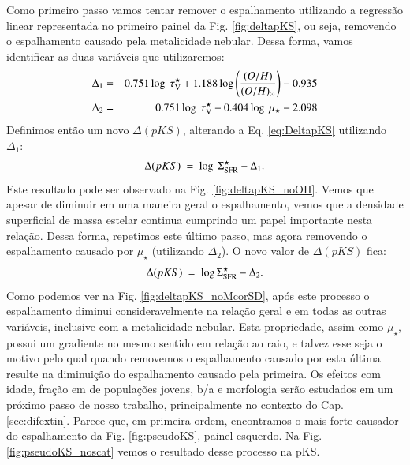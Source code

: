 Como primeiro passo vamos tentar remover o espalhamento utilizando a regressão linear representada
no primeiro painel da Fig. \ref{fig:deltapKS}, ou seja, removendo o espalhamento causado pela
metalicidade nebular. Dessa forma, vamos identificar as duas variáveis que utilizaremos:
\begin{eqnarray}
	\Delta_1 &=& 0.751 \log\ \tau_{\mathrm{V}}^\star + 1.188 \log \left(\frac{(O/H)}{(O/H)_\odot}\right) - 0.935 \\
	\label{eq:Delta1}
	\Delta_2 &=& 0.751 \log\ \tau_{\mathrm{V}}^\star + 0.404 \log\ \mu_\star - 2.098 \\
	\label{eq:Delta2}
\end{eqnarray}
Definimos então um novo $\Delta(pKS)$, alterando a Eq. \ref{eq:DeltapKS} utilizando $\Delta_1$:
\begin{equation}
	\Delta(pKS)\ =\ \log\ \Sigma_{\mathrm{SFR}}^\star - \Delta_1.
\end{equation}
\noindent Este resultado pode ser observado na Fig. \ref{fig:deltapKS_noOH}. Vemos que apesar
de diminuir em uma maneira geral o espalhamento, vemos que a densidade superficial de massa estelar
continua cumprindo um papel importante nesta relação. Dessa forma, repetimos este último passo, mas
agora removendo o espalhamento causado por $\mu_\star$ (utilizando $\Delta_2$). O novo valor de
$\Delta(pKS)$ fica:
\begin{equation}
	\Delta(pKS)\ =\ \log \Sigma_{\mathrm{SFR}}^\star - \Delta_2.
\end{equation}
\noindent Como podemos ver na Fig. \ref{fig:deltapKS_noMcorSD}, após este processo o
espalhamento diminui consideravelmente na relação geral e em todas as outras variáveis, inclusive
com a metalicidade nebular. Esta propriedade, assim como $\mu_\star$, possui um gradiente no mesmo
sentido em relação ao raio, e talvez esse seja o motivo pelo qual quando removemos o espalhamento
causado por esta última resulte na diminuição do espalhamento causado pela primeira. Os efeitos com
idade, fração em de populações jovens, b/a e morfologia serão estudados em um próximo passo de
nosso trabalho, principalmente no contexto do Cap. \ref{sec:difextin}. Parece que, em primeira
ordem, encontramos o mais forte causador do espalhamento da Fig. \ref{fig:pseudoKS}, painel
esquerdo. Na Fig. \ref{fig:pseudoKS_noscat} vemos o resultado desse processo na pKS.

